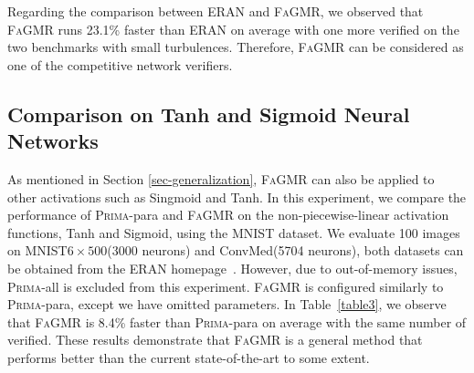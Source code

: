 \documentclass[runningheads]{llncs}
\newcommand{\ourtool}{\textsc{FaGMR}\xspace}
\newcommand{\prima}{\textsc{Prima}\xspace}
\newcommand{\mnist}{MNIST\xspace}
\newcommand{\eran}{\textsc{ERAN}\xspace}
\begin{document}
Regarding the comparison between \eran and \ourtool, we observed that \ourtool runs 23.1\% faster than \eran on average with one more verified on the two benchmarks with small turbulences. Therefore, \ourtool can be considered as one of the competitive network verifiers.


%
%
%
\subsection{Comparison on Tanh and Sigmoid Neural Networks}\label{Sec5.5}
As mentioned in Section \ref{sec-generalization}, \ourtool can also be applied to other activations such
as Singmoid and Tanh. 
In this experiment, we compare the performance of \prima-para and \ourtool on the non-piecewise-linear activation functions, Tanh and Sigmoid, using the \mnist dataset. We evaluate 100 images on \mnist $6\times 500$(3000 neurons) and ConvMed(5704 neurons), both datasets can be obtained from the \eran homepage~\cite{ref_url4}. However, due to out-of-memory issues, \prima-all is excluded from this experiment.
\ourtool is configured similarly to \prima-para, except we have omitted parameters. In Table~\ref{table3}, we observe that \ourtool is 8.4\% faster than \prima-para on average with the same number of verified. These results demonstrate that \ourtool is a general method that performs better than the current state-of-the-art to some extent.

\end{document}
